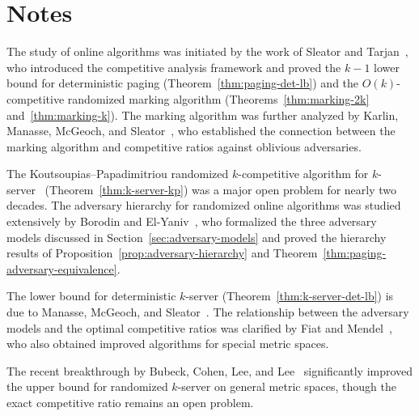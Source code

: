 \documentclass[twoside,12pt]{book}
\theoremstyle{plain}
\theoremstyle{definition}
\theoremstyle{remark}
\begin{document}




\section*{Notes}
\label{sec:online-notes}

The study of online algorithms was initiated by the work of
Sleator and Tarjan~\cite{sleator1985amortized}, who introduced the
competitive analysis framework and proved the $k-1$ lower bound for
deterministic paging (Theorem~\ref{thm:paging-det-lb}) and the
$O(k)$-competitive randomized marking algorithm
(Theorems~\ref{thm:marking-2k} and~\ref{thm:marking-k}).  The
marking algorithm was further analyzed by Karlin, Manasse, McGeoch,
and Sleator~\cite{karlin1988competitve}, who established the connection
between the marking algorithm and competitive ratios against oblivious
adversaries.

The Koutsoupias--Papadimitriou randomized $k$-competitive algorithm for
$k$-server~\cite{koutsoupias1995k} (Theorem~\ref{thm:k-server-kp}) was
a major open problem for nearly two decades.  The adversary hierarchy for
randomized online algorithms was studied extensively by Borodin and
El-Yaniv~\cite{borodin1998online}, who formalized the three adversary
models discussed in Section~\ref{sec:adversary-models} and proved the
hierarchy results of Proposition~\ref{prop:adversary-hierarchy} and
Theorem~\ref{thm:paging-adversary-equivalence}.

The lower bound for deterministic $k$-server
(Theorem~\ref{thm:k-server-det-lb}) is due to Manasse, McGeoch, and
Sleator~\cite{manasse1988greedy}.  The relationship between the
adversary models and the optimal competitive ratios was clarified by
Fiat and Mendel~\cite{fiat1997optimal}, who also obtained improved
algorithms for special metric spaces.

The recent breakthrough by Bubeck, Cohen, Lee, and
Lee~\cite{bubeck2021randomized} significantly improved the upper bound
for randomized $k$-server on general metric spaces, though the exact
competitive ratio remains an open problem.
\end{document}
